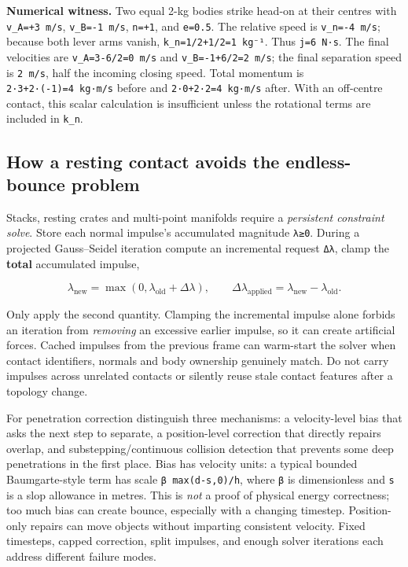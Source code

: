 \textbf{Numerical witness.} Two equal 2-kg bodies strike head-on at their centres with \texttt{v\_A=+3\ m/s}, \texttt{v\_B=-1\ m/s}, \texttt{n=+1}, and \texttt{e=0.5}. The relative speed is \texttt{v\_n=-4\ m/s}; because both lever arms vanish, \texttt{k\_n=1/2+1/2=1\ kg⁻¹}. Thus \texttt{j=6\ N·s}. The final velocities are \texttt{v\textquotesingle{}\_A=3-6/2=0\ m/s} and \texttt{v\textquotesingle{}\_B=-1+6/2=2\ m/s}; the final separation speed is \texttt{2\ m/s}, half the incoming closing speed. Total momentum is \texttt{2·3+2·(-1)=4\ kg·m/s} before and \texttt{2·0+2·2=4\ kg·m/s} after. With an off-centre contact, this scalar calculation is insufficient unless the rotational terms are included in \texttt{k\_n}.

\subsection{How a resting contact avoids the endless-bounce problem}\label{06-engine-ii-ch033-how-a-resting-contact-avoids-the-endless-bounce-problem}

Stacks, resting crates and multi-point manifolds require a \emph{persistent constraint solve}. Store each normal impulse's accumulated magnitude \texttt{λ≥0}. During a projected Gauss--Seidel iteration compute an incremental request \texttt{Δλ}, clamp the \textbf{total} accumulated impulse,

\[
\lambda_{\mathrm{new}}=\max(0,\lambda_{\mathrm{old}}+\Delta\lambda),\qquad
\Delta\lambda_{\mathrm{applied}}=\lambda_{\mathrm{new}}-\lambda_{\mathrm{old}}.
\]

Only apply the second quantity. Clamping the incremental impulse alone forbids an iteration from \emph{removing} an excessive earlier impulse, so it can create artificial forces. Cached impulses from the previous frame can warm-start the solver when contact identifiers, normals and body ownership genuinely match. Do not carry impulses across unrelated contacts or silently reuse stale contact features after a topology change.

For penetration correction distinguish three mechanisms: a velocity-level bias that asks the next step to separate, a position-level correction that directly repairs overlap, and substepping/continuous collision detection that prevents some deep penetrations in the first place. Bias has velocity units: a typical bounded Baumgarte-style term has scale \texttt{β\ max(d-s,0)/h}, where \texttt{β} is dimensionless and \texttt{s} is a slop allowance in metres. This is \emph{not} a proof of physical energy correctness; too much bias can create bounce, especially with a changing timestep. Position-only repairs can move objects without imparting consistent velocity. Fixed timesteps, capped correction, split impulses, and enough solver iterations each address different failure modes.

